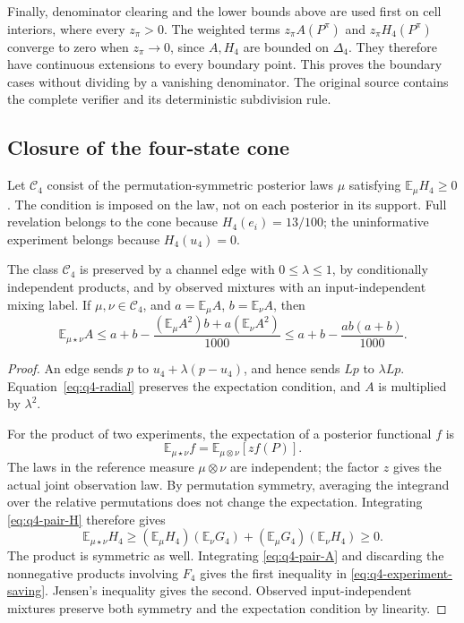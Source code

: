 Finally, denominator clearing and the lower bounds above are used first on
cell interiors, where every $z_\pi>0$.  The weighted terms
$z_\pi A(P^\pi)$ and $z_\pi H_4(P^\pi)$ converge to zero when
$z_\pi\to0$, since $A,H_4$ are bounded on $\Delta_4$.  They therefore have
continuous extensions to every boundary point.  This proves the boundary
cases without dividing by a vanishing denominator.  The original source
contains the complete verifier and its deterministic subdivision rule.

\subsection{Closure of the four-state cone}

Let $\mathcal C_4$ consist of the permutation-symmetric posterior laws
$\mu$ satisfying $\mathbb E_\mu H_4\ge0$.  The condition is imposed on the
law, not on each posterior in its support.  Full revelation belongs to the
cone because $H_4(e_i)=13/100$; the uninformative experiment belongs because
$H_4(u_4)=0$.

\begin{lemma}
\label{lem:q4-cone-closure}
The class $\mathcal C_4$ is preserved by a channel edge with
$0\le\lambda\le1$, by conditionally independent products, and by observed
mixtures with an input-independent mixing label.  If
$\mu,\nu\in\mathcal C_4$, and
$a=\mathbb E_\mu A$, $b=\mathbb E_\nu A$, then
\begin{equation}
 \mathbb E_{\mu\star\nu}A
 \le a+b-
 \frac{(\mathbb E_\mu A^2)b+a(\mathbb E_\nu A^2)}{1000}
 \le a+b-\frac{ab(a+b)}{1000}.
 \label{eq:q4-experiment-saving}
\end{equation}
\end{lemma}

\begin{proof}
An edge sends $p$ to $u_4+\lambda(p-u_4)$, and hence sends $Lp$ to
$\lambda Lp$.  Equation~\eqref{eq:q4-radial} preserves the expectation
condition, and $A$ is multiplied by $\lambda^2$.

For the product of two experiments, the expectation of a posterior
functional $f$ is
\[
 \mathbb E_{\mu\star\nu}f
 =\mathbb E_{\mu\otimes\nu}[z f(P)].
\]
The laws in the reference measure $\mu\otimes\nu$ are independent; the
factor $z$ gives the actual joint observation law.  By permutation
symmetry, averaging the integrand over the relative permutations does not
change the expectation.  Integrating \eqref{eq:q4-pair-H} therefore gives
\[
 \mathbb E_{\mu\star\nu}H_4
 \ge (\mathbb E_\mu H_4)(\mathbb E_\nu G_4)
      +(\mathbb E_\mu G_4)(\mathbb E_\nu H_4)\ge0.
\]
The product is symmetric as well.  Integrating
\eqref{eq:q4-pair-A} and discarding the nonnegative products involving
$F_4$ gives the first inequality in
\eqref{eq:q4-experiment-saving}.  Jensen's inequality gives the second.
Observed input-independent mixtures preserve both symmetry and the
expectation condition by linearity.
\end{proof}

